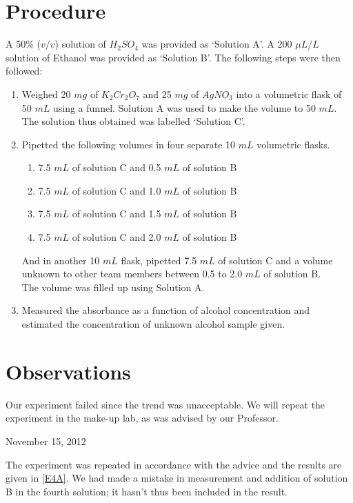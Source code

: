 \section{Procedure}
	A 50\% ($v/v$) solution of $H_{2}SO_{4}$ was provided as `Solution A'. A 200 $\mu L/L$ solution of Ethanol was provided as `Solution B'. The following steps were then followed:
	\begin{enumerate}
		\item Weighed 20 $mg$ of $K_{2}Cr_{2}O_{7}$ and 25 $mg$ of $AgNO_{3}$ into a volumetric flask of 50 $mL$ using a funnel. Solution A was used to make the volume to 50 $mL$. The solution thus obtained was labelled `Solution C'.
		\item Pipetted the following volumes in four separate 10 $mL$ volumetric flasks.
			\begin{enumerate}
				\item 7.5 $mL$ of solution C and 0.5 $mL$ of solution B
				\item 7.5 $mL$ of solution C and 1.0 $mL$ of solution B
				\item 7.5 $mL$ of solution C and 1.5 $mL$ of solution B
				\item 7.5 $mL$ of solution C and 2.0 $mL$ of solution B
			\end{enumerate}		
		And in another 10 $mL$ flask, pipetted 7.5 $mL$ of solution C and a volume unknown to other team members between 0.5 to 2.0 $mL$ of solution B.\\
		The volume was filled up using Solution A.
		\item Measured the absorbance as a function of alcohol concentration and estimated the concentration of unknown alcohol sample given.
	\end{enumerate}


\section{Observations}
Our experiment failed since the trend was unacceptable. We will repeat the experiment in the make-up lab, as was advised by our Professor.
\begin{flushright}
November 15, 2012
\end{flushright}
The experiment was repeated in accordance with the advice and the results are given in \autoref{E4A}. We had made a mistake in measurement and addition of solution B in the fourth solution; it hasn't thus been included in the result.

